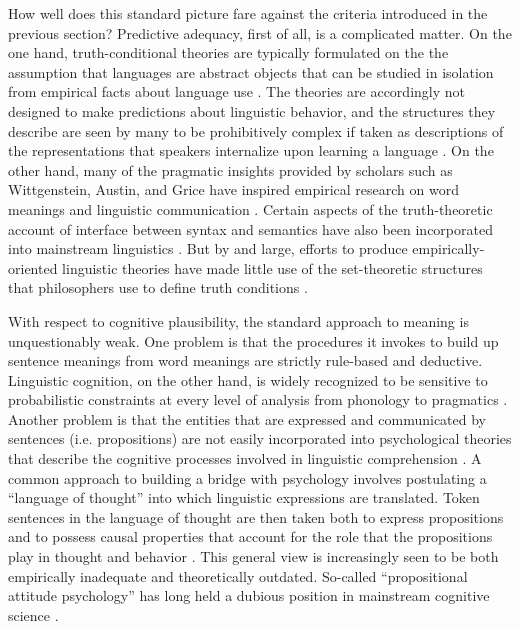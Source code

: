 How well does this standard picture fare against the criteria introduced in the previous section? Predictive adequacy, first of all, is a complicated matter. On the one hand, truth-conditional theories are typically formulated on the the assumption that languages are abstract objects that can be studied in isolation from empirical facts about language use \citep[][]{Lewis:1970, Jackendoff:2002, Speaks:2014}. The theories are accordingly not designed to make predictions about linguistic behavior, and the structures they describe are seen by many to be prohibitively complex if taken as descriptions of the representations that speakers internalize upon learning a language \citep{Jackendoff:2002,LiangPotts:2015}. On the other hand, many of the pragmatic insights provided by scholars such as Wittgenstein, Austin, and Grice have inspired empirical research on word meanings and linguistic communication \citep{Pinker:1994,Bloom:2001,Harley:2014}. Certain aspects of the truth-theoretic account of interface between syntax and semantics have also been incorporated into mainstream linguistics \citep{SmolenskyLegendre:2006}. But by and large, efforts to produce empirically-oriented linguistic theories have made little use of the set-theoretic structures that philosophers use to define truth conditions \citep{Jackendoff:2002,Harley:2014}. 

With respect to cognitive plausibility, the standard approach to meaning is unquestionably weak. One problem is that the procedures it invokes to build up sentence meanings from word meanings are strictly rule-based and deductive. Linguistic cognition, on the other hand, is widely recognized to be sensitive to probabilistic constraints at every level of analysis from phonology to pragmatics  \citep{SmolenskyLegendre:2006,Christiansen:2015,ChaterManning:2006,Seidenberg:1997}. Another problem is that the entities that are expressed and communicated by sentences (i.e. propositions) are not easily incorporated into psychological theories that describe the cognitive processes involved in linguistic comprehension \citep[][Ch. 5]{Dennett:1987}. A common approach to building a bridge with psychology involves postulating a ``language of thought'' into which linguistic expressions are translated. Token sentences in the language of thought are then taken both to express propositions and to possess causal properties that account for the role that the propositions play in thought and behavior \citep{Fodor:1998}. This general view is increasingly seen to be both empirically inadequate and theoretically outdated. So-called ``propositional attitude psychology'' has long held a dubious position in mainstream cognitive science \citep{Dennett:1987,Churchland:1993}.

